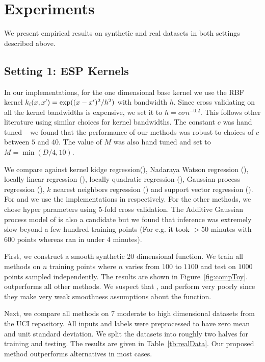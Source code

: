 \section{Experiments}
\label{sec:experiments}

\insertTableRealData

We present empirical results on synthetic and real datasets in both settings
described above.

\subsection{Setting 1: ESP Kernels}

In our implementations, for the one dimensional base kernel we use
the RBF kernel $k_i(x,x') = \exp((x-x')^2/h^2)$ with bandwidth $h$.
Since cross validating on all the kernel bandwidths is expensive, we set
it to $h = c\sigma n^{-0.2}$. This follows other literature 
\cite{gyorfi02distributionfree,ravikumar09spam} using similar choices for kernel
bandwidths. The constant $c$ was hand tuned -- we found that the performance of
our methods was robust to choices of $c$ between $5$ and $40$.
The value of $M$ was also hand tuned and set to $M = \min(D/4, 10)$.

We compare \addkrrs against kernel kidge regression(\krr),
Nadaraya Watson regression (\nw), locally linear regression (\locallin), locally
quadratic regression (\localquad), Gaussian process regression (\gp), $k$
nearest neighbors regression (\knn) and support vector regression (\svr).
For \gps and \svrs we use the implementations in
\citet{rasmussen10gpml,chang11libsvm} respectively.
For the other methods, we chose hyper parameters using $5$-fold cross
validation.
The Additive Gaussian process model of \citet{duvenaud11additivegps} is also a
candidate but we found that inference was extremely slow beyond a few hundred
training points (For e.g. it took $> 50$ minutes with $600$ points whereas
\addkrrs ran in under $4$ minutes).

First, we construct a smooth synthetic 20 dimensional function. We train all methods on
$n$ training points where $n$ varies from $100$ to $1100$ and test on $1000$
points sampled independently. The results are shown in Figure~\ref{fig:compToy}.
\addkrrs outperforms all other methods. We suspect that \nw, \locallins and \knns perform
very poorly since they make very weak smoothness assumptions about the function.

Next, we compare all methods on $7$ moderate to high dimensional datasets from the UCI
repository. All inputs and labels were preprocessed to have zero mean and unit
standard deviation. We split the datasets into roughly two halves for training
and testing. The results are given in Table~\ref{tb:realData}. Our proposed
method outperforms alternatives in most cases.

